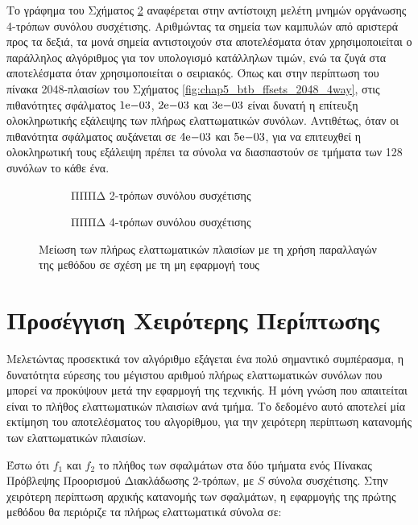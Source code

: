 \par
Το γράφημα του Σχήματος \ref{fig:chap5_btb_ffsets_4way} αναφέρεται στην αντίστοιχη μελέτη μνημών οργάνωσης 4-τρόπων συνόλου συσχέτισης. Αριθμώντας τα σημεία των καμπυλών από αριστερά προς τα δεξιά, τα μονά σημεία αντιστοιχούν στα αποτελέσματα όταν χρησιμοποιείται ο παράλληλος αλγόριθμος για τον υπολογισμό κατάλληλων τιμών, ενώ τα ζυγά στα αποτελέσματα όταν χρησιμοποιείται ο σειριακός. Όπως και στην περίπτωση του πίνακα 2048-πλαισίων του Σχήματος \ref{fig:chap5_btb_ffsets_2048_4way}, στις  πιθανότητες σφάλματος $1\mathrm{e}{-03}$, $2\mathrm{e}{-03}$ και $3\mathrm{e}{-03}$ είναι δυνατή η επίτευξη ολοκληρωτικής εξάλειψης των πλήρως ελαττωματικών συνόλων. Αντιθέτως, όταν οι πιθανότητα σφάλματος αυξάνεται σε $4\mathrm{e}{-03}$ και $5\mathrm{e}{-03}$, για να επιτευχθεί η ολοκληρωτική τους εξάλειψη πρέπει τα σύνολα να διασπαστούν σε τμήματα των 128 συνόλων το κάθε ένα.

\begin{figure}[!t]
    \centering
    \begin{subfigure}[t]{\textwidth}
        \centering
        \caption{ΠΠΠΔ 2-τρόπων συνόλου συσχέτισης}
        \label{fig:chap5_btb_ffsets_2way}
    \end{subfigure}
    
    \begin{subfigure}[t]{\textwidth}
        \centering
        \caption{ΠΠΠΔ 4-τρόπων συνόλου συσχέτισης}
        \label{fig:chap5_btb_ffsets_4way}
    \end{subfigure}
    \caption{Μείωση των πλήρως ελαττωματικών πλαισίων με τη χρήση παραλλαγών της μεθόδου σε σχέση με τη μη εφαρμογή τους}
    \label{fig:chap5_btb_ffsets}
\end{figure}


\section{Προσέγγιση Χειρότερης Περίπτωσης}
\label{chap5_maxFFSets_num}

Μελετώντας προσεκτικά τον αλγόριθμο εξάγεται ένα πολύ σημαντικό συμπέρασμα, η δυνατότητα εύρεσης του μέγιστου αριθμού πλήρως ελαττωματικών συνόλων που μπορεί να προκύψουν μετά την εφαρμογή της τεχνικής. Η μόνη γνώση που απαιτείται είναι το πλήθος ελαττωματικών πλαισίων ανά τμήμα. Το δεδομένο αυτό αποτελεί μία εκτίμηση του αποτελέσματος του αλγορίθμου, για την χειρότερη περίπτωση κατανομής των ελαττωματικών πλαισίων.
\par
Έστω ότι $f_1$ και $f_2$ το πλήθος των σφαλμάτων στα δύο τμήματα ενός Πίνακας Πρόβλεψης Προορισμού Διακλάδωσης 2-τρόπων, με $S$ σύνολα συσχέτισης. Στην χειρότερη περίπτωση αρχικής κατανομής των σφαλμάτων, η εφαρμογής της πρώτης μεθόδου θα περιόριζε τα πλήρως ελαττωματικά σύνολα σε:

